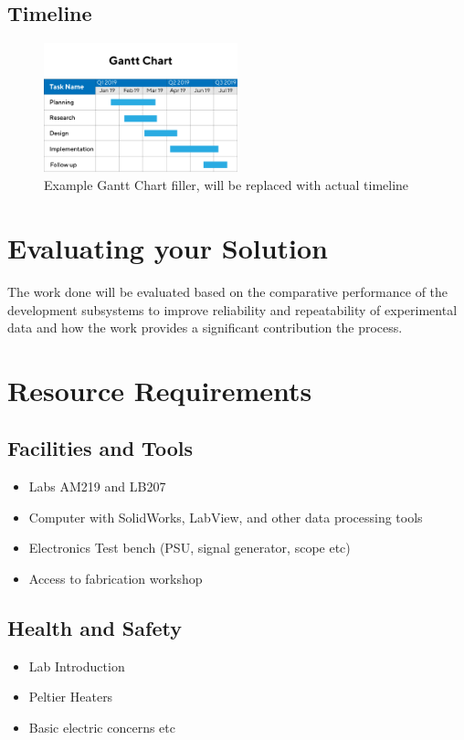 \documentclass[11pt, a4paper, twoside, openright]{report}
\begin{document}
\subsection{Timeline}
\begin{figure}[h]
  \centering
  \includegraphics[width=0.5\textwidth]{Figures/Gantt-chart_filler.png}
  \caption{Example Gantt Chart filler, will be replaced with actual timeline}
\end{figure}

\section{Evaluating your Solution}
The work done will be evaluated based on the comparative performance of the development subsystems to improve reliability and repeatability of experimental data and how the work provides a significant contribution the process. 

\section{Resource Requirements}

\subsection{Facilities and Tools}
\begin{itemize}
  \item Labs AM219 and LB207
  \item Computer with SolidWorks, LabView, and other data processing tools
  \item Electronics Test bench (PSU, signal generator, scope etc)
  \item Access to fabrication workshop
\end{itemize}

\subsection{Health and Safety}
\begin{itemize}
  \item Lab Introduction
  \item Peltier Heaters
  \item Basic electric concerns etc
\end{itemize}
\end{document}
